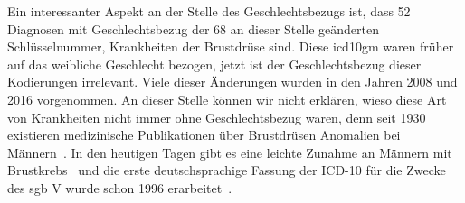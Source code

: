 Ein interessanter Aspekt an der Stelle des Geschlechtsbezugs ist, dass 52 Diagnosen mit Geschlechtsbezug der 68 an dieser Stelle geänderten Schlüsselnummer, Krankheiten der Brustdrüse sind. Diese \ac{icd10gm} waren früher auf das weibliche Geschlecht bezogen, jetzt ist der Geschlechtsbezug dieser Kodierungen irrelevant. Viele dieser Änderungen wurden in den Jahren 2008 und 2016 vorgenommen. An dieser Stelle können wir nicht erklären, wieso diese Art von Krankheiten nicht immer ohne Geschlechtsbezug waren, denn seit 1930 existieren medizinische Publikationen über Brustdrüsen Anomalien bei Männern~\cite{bcm}. In den heutigen Tagen gibt es eine leichte Zunahme an Männern mit Brustkrebs~\cite{giobcm} und die erste deutschsprachige Fassung der ICD-10 für die Zwecke des \ac{sgb} V wurde schon 1996 erarbeitet~\cite{icdgmhistory}.

\clearpage

